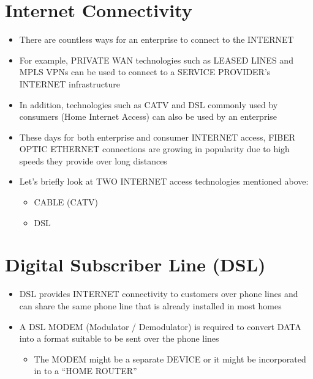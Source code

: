 \section{Internet Connectivity}\label{internet-connectivity}

\begin{itemize}
\tightlist
\item
  There are countless ways for an enterprise to connect to the INTERNET
\item
  For example, PRIVATE WAN technologies such as LEASED LINES and MPLS
  VPNs can be used to connect to a SERVICE PROVIDER's INTERNET
  infrastructure
\item
  In addition, technologies such as CATV and DSL commonly used by
  consumers (Home Internet Access) can also be used by an enterprise
\item
  These days for both enterprise and consumer INTERNET access, FIBER
  OPTIC ETHERNET connections are growing in popularity due to high
  speeds they provide over long distances
\item
  Let's briefly look at TWO INTERNET access technologies mentioned
  above:

  \begin{itemize}
  \tightlist
  \item
    CABLE (CATV)
  \item
    DSL
  \end{itemize}
\end{itemize}

\section{Digital Subscriber Line
(DSL)}\label{digital-subscriber-line-dsl}

\begin{itemize}
\tightlist
\item
  DSL provides INTERNET connectivity to customers over phone lines and
  can share the same phone line that is already installed in most homes
\item
  A DSL MODEM (Modulator / Demodulator) is required to convert DATA into
  a format suitable to be sent over the phone lines

  \begin{itemize}
  \tightlist
  \item
    The MODEM might be a separate DEVICE or it might be incorporated in
    to a ``HOME ROUTER''
  \end{itemize}
\end{itemize}

